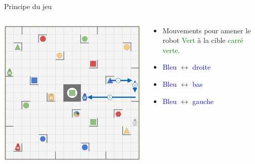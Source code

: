 \documentclass{beamer}
\begin{document}
\begin{frame}{Principe du jeu}
    \begin{columns}
        \begin{column}{0.6\textwidth}
        \vspace{\topsep}
        \includegraphics[scale=0.4]{Images/r5.png}%
        \end{column}
        
        \begin{column}{0.4\textwidth}
        \begin{itemize}
        \item Mouvements pour amener le robot \textcolor{green}{Vert} à la cible \textcolor{green}{carré verte}.
        \item \textcolor{blue}{Bleu} $\longleftrightarrow$ \textcolor{blue}{droite}
        \item \textcolor{blue}{Bleu} $\longleftrightarrow$ \textcolor{blue}{bas}
        \item \textcolor{blue}{Bleu} $\longleftrightarrow$ \textcolor{blue}{gauche}
        \end{itemize}
        \end{column}
    \end{columns}
\end{frame}
\end{document}
